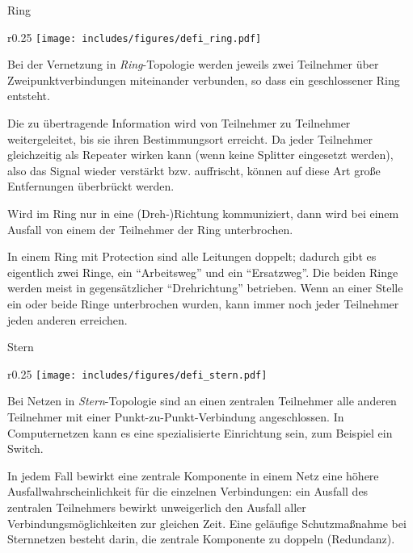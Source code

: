 \begin{defi}{Ring}
    \begin{wrapfigure}{r}{0.25\textwidth}
        \centering
        \texttt{[image: includes/figures/defi\_ring.pdf]}
    \end{wrapfigure}%
    Bei der Vernetzung in \emph{Ring}-Topologie werden jeweils zwei Teilnehmer über Zweipunktverbindungen miteinander verbunden, so dass ein geschlossener Ring entsteht.

    Die zu übertragende Information wird von Teilnehmer zu Teilnehmer weitergeleitet, bis sie ihren Bestimmungsort erreicht.
    Da jeder Teilnehmer gleichzeitig als Repeater wirken kann (wenn keine Splitter eingesetzt werden), also das Signal wieder verstärkt bzw. auffrischt, können auf diese Art große Entfernungen überbrückt werden.

    Wird im Ring nur in eine (Dreh-)Richtung kommuniziert, dann wird bei einem Ausfall von einem der Teilnehmer der Ring unterbrochen.

    In einem Ring mit Protection sind alle Leitungen doppelt; dadurch gibt es eigentlich zwei Ringe, ein \enquote{Arbeitsweg} und ein \enquote{Ersatzweg}.
    Die beiden Ringe werden meist in gegensätzlicher \enquote{Drehrichtung} betrieben.
    Wenn an einer Stelle ein oder beide Ringe unterbrochen wurden, kann immer noch jeder Teilnehmer jeden anderen erreichen.
\end{defi}

\begin{defi}{Stern}
    \begin{wrapfigure}{r}{0.25\textwidth}
        \centering
        \texttt{[image: includes/figures/defi\_stern.pdf]}
    \end{wrapfigure}%
    Bei Netzen in \emph{Stern}-Topologie sind an einen zentralen Teilnehmer alle anderen Teilnehmer mit einer Punkt-zu-Punkt-Verbindung angeschlossen.
    In Computernetzen kann es eine spezialisierte Einrichtung sein, zum Beispiel ein Switch.

    In jedem Fall bewirkt eine zentrale Komponente in einem Netz eine höhere Ausfallwahrscheinlichkeit für die einzelnen Verbindungen:
    ein Ausfall des zentralen Teilnehmers bewirkt unweigerlich den Ausfall aller Verbindungsmöglichkeiten zur gleichen Zeit.
    Eine geläufige Schutzmaßnahme bei Sternnetzen besteht darin, die zentrale Komponente zu doppeln (Redundanz).
\end{defi}

